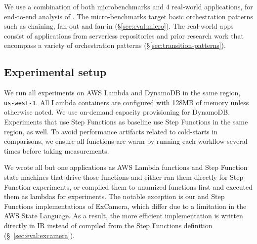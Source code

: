 


We use a combination of both microbenchmarks and 4 real-world applications,
for end-to-end analysis of \name{}. The micro-benchmarks target basic
orchestration patterns such as chaining, fan-out and fan-in
(\S\ref{sec:eval:micro}). The real-world apps consist of applications from
serverless repositories and prior research work  that encompass a variety of
orchestration patterns (\S\ref{sec:transition-patterns}).


\subsection{Experimental setup}

We run all experiments on AWS Lambda and DynamoDB in the same region,
\texttt{us-west-1}. All Lambda containers are configured with 128MB of memory
unless otherwise noted. We use on-demand capacity provisioning for DynamoDB.
Experiments that use Step Functions as baseline use Step Functions in the same
region, as well. To avoid performance artifacts related to cold-starts in
comparisons, we ensure all functions are warm by running each workflow several
times before taking measurements.

We wrote all but one applications as AWS Lambda functions and Step Function
state machines that drive those functions and either ran them directly for
Step Function experiments, or compiled them to unumized functions first and
executed them as lambdas for \name{} experiments. The notable exception is our
\name{} and Step Functions implementations of ExCamera, which differ due to a
limitation in the AWS State Language. As a result, the more efficient \name{}
implementation is written directly in \name{} IR instead of compiled from the
Step Functions definition (\S~\ref{sec:eval:excamera}).

